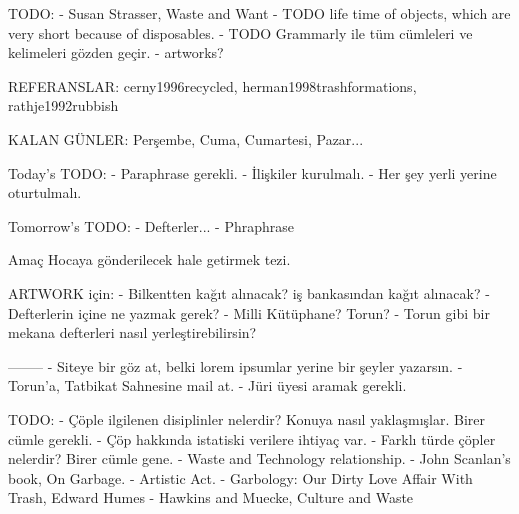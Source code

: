 TODO:
- Susan Strasser, Waste and Want
- TODO life time of objects, which are very short because of disposables.
- TODO Grammarly ile tüm cümleleri ve kelimeleri gözden geçir.
- artworks?


REFERANSLAR:
cerny1996recycled, herman1998trashformations, rathje1992rubbish

KALAN GÜNLER:
Perşembe, Cuma, Cumartesi, Pazar...

Today's TODO:
- Paraphrase gerekli.
- İlişkiler kurulmalı.
- Her şey yerli yerine oturtulmalı.

Tomorrow's TODO:
- Defterler...
- Phraphrase


Amaç Hocaya gönderilecek hale getirmek tezi.



ARTWORK için:
- Bilkentten kağıt alınacak? iş bankasından kağıt alınacak?
- Defterlerin içine ne yazmak gerek?
- Milli Kütüphane? Torun?
- Torun gibi bir mekana defterleri nasıl yerleştirebilirsin?


--------
- Siteye bir göz at, belki lorem ipsumlar yerine bir şeyler yazarsın.
- Torun'a, Tatbikat Sahnesine mail at.
- Jüri üyesi aramak gerekli.


TODO:
- Çöple ilgilenen disiplinler nelerdir? Konuya nasıl yaklaşmışlar. Birer cümle gerekli.
- Çöp hakkında istatiski verilere ihtiyaç var.
- Farklı türde çöpler nelerdir? Birer cümle gene.
- Waste and Technology relationship.
- John Scanlan's book, On Garbage.
- Artistic Act.
- Garbology: Our Dirty Love Affair With Trash, Edward Humes
- Hawkins and Muecke, Culture and Waste

